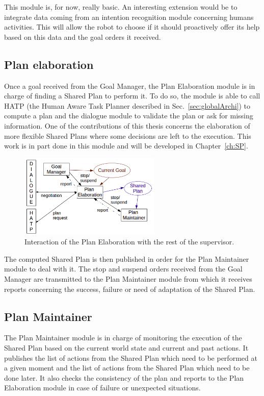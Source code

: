 \documentclass[english,a4paper,11pt,twoside]{StyleThese}
\begin{document}
This module is, for now, really basic. An interesting extension would be to integrate data coming from an intention recognition module concerning humans activities. This will allow the robot to choose if it should proactively offer its help based on this data and the goal orders it received. 

\subsection{Plan elaboration}

Once a goal received from the Goal Manager, the Plan Elaboration module is in charge of finding a Shared Plan to perform it. To do so, the module is able to call HATP (the Human Aware Task Planner described in Sec.~\ref{sec:globalArchi}) to compute a plan and the dialogue module to validate the plan or ask for missing information. One of the contributions of this thesis concerns the elaboration of more flexible Shared Plans where some decisions are left to the execution. This work is in part done in this module and will be developed in Chapter~\ref{ch:SP}.

\begin{figure}[!h]
	\centering
    \includegraphics[width=0.6\textwidth]{figs/Chapter2/PlanElaboration.png}
    \caption{Interaction of the Plan Elaboration with the rest of the supervisor.}
    \label{fig:planElaboration}
\end{figure}

The computed Shared Plan is then published in order for the Plan Maintainer module to deal with it. The stop and suspend orders received from the Goal Manager are transmitted to the Plan Maintainer module from which it receives reports concerning the success, failure or need of adaptation of the Shared Plan.

\subsection{Plan Maintainer}

The Plan Maintainer module is in charge of monitoring the execution of the Shared Plan based on the current world state and current and past actions. It publishes the list of actions from the Shared Plan which need to be performed at a given moment and the list of actions from the Shared Plan which need to be done later. It also checks the consistency of the plan and reports to the Plan Elaboration module in case of failure or unexpected situations.
\end{document}
